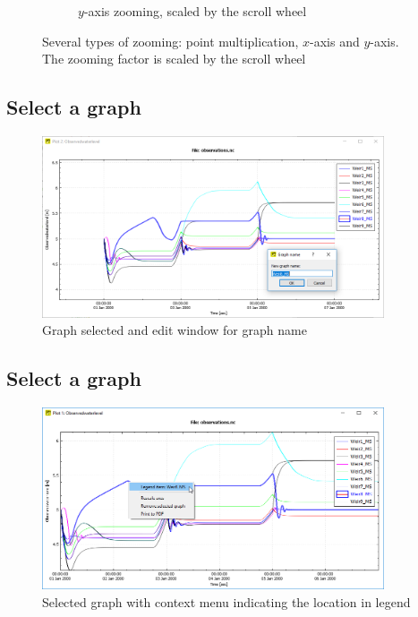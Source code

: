 \documentclass{deltares_memo}
\begin{document}
\begin{figure}[H]
\begin{subfigure}{0.3\textwidth}
    \caption{$y$-axis zooming, scaled by the scroll wheel}
\end{subfigure}
\caption{Several types of zooming: point multiplication, $x$-axis and $y$-axis. The zooming factor is scaled by the scroll wheel}
\end{figure}

\subsection{Select a graph}
\phantom{m}\vspace{-\baselineskip}
\begin{figure}[H]
    \centering    
    \includegraphics[width=0.9\textwidth]{pictures/plot_selected_graph.png}
    \caption{Graph selected and edit window for graph name\label{fig:selected graph}}
\end{figure}

\subsection{Select a graph}
\phantom{m}\vspace{-\baselineskip}
\begin{figure}[H]
    \centering    
    \includegraphics[width=0.9\textwidth]{pictures/plot_context_menu.png}
    \caption{Selected graph with context menu indicating the location in legend\label{fig:selected graph_with_context_menu}}
\end{figure}
\end{document}

